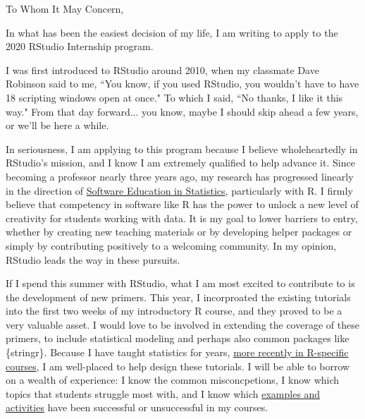 \documentclass[10pt, a4paper]{letter} %
\begin{document}

\begin{letter}{
}


\opening{To Whom It May Concern,}

In what has been the easiest decision of my life, I am writing to apply to the 2020 RStudio Internship program.  

I was first introduced to RStudio around 2010, when my classmate Dave Robinson said to me, ``You know, if you used RStudio, you wouldn't have to have 18 scripting windows open at once."  To which I said, ``No thanks, I like it this way."  From that day forward... you know, maybe I should skip ahead a few years, or we'll be here a while.

In seriousness, I am applying to this program because I believe wholeheartedly in RStudio's mission, and I know I am extremely qualified to help advance it.  Since becoming a professor nearly three years ago, my research has progressed linearly in the direction of \href{https://rstudio.csm.calpoly.edu/Normal_Distributions/}{Software Education in Statistics}, particularly with R.  I firmly believe that competency in software like R has the power to unlock a new level of creativity for students working with data.  It is my goal to lower barriers to entry, whether by creating new teaching materials or by developing helper packages or simply by contributing positively to a welcoming community.  In my opinion, RStudio leads the way in these pursuits.

If I spend this summer with RStudio, what I am most excited to contribute to is the development of new primers.  This year, I incorproated the existing tutorials into the first two weeks of my introductory R course, and they proved to be a very valuable asset.  I would love to be involved in extending the coverage of these primers, to include statistical modeling and perhaps also common packages like \{stringr\}.  Because I have taught statistics for years, \href{https://web.calpoly.edu/~kbodwin/r-workshop/}{more recently in R-specific courses}, I am well-placed to help design these tutorials.  I will be able to borrow on a wealth of experience: I know the common misconcpetions, I know which topics that students struggle most with, and I know which \href{https://github.com/kbodwin/decodeR}{examples and activities} have been successful or unsuccessful in my courses.


\end{letter}
\end{document}
